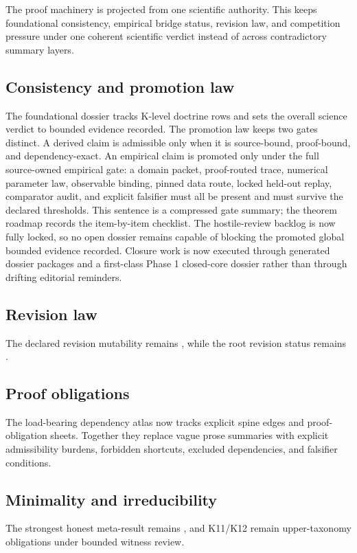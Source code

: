 The proof machinery is projected from one scientific authority. This keeps foundational consistency, empirical bridge status, revision law, and competition pressure under one coherent scientific verdict instead of across contradictory summary layers.

\subsection{Consistency and promotion law}
The foundational dossier tracks  K-level doctrine rows and sets the overall science verdict to bounded evidence recorded.
The promotion law keeps two gates distinct. A derived claim is admissible only when it is source-bound, proof-bound, and dependency-exact. An empirical claim is promoted only under the full source-owned empirical gate: a domain packet, proof-routed trace, numerical parameter law, observable binding, pinned data route, locked held-out replay, comparator audit, and explicit falsifier must all be present and must survive the declared thresholds. This sentence is a compressed gate summary; the theorem roadmap records the item-by-item checklist.
The hostile-review backlog is now fully locked, so no open dossier remains capable of blocking the promoted global bounded evidence recorded.
Closure work is now executed through generated dossier packages and a first-class Phase 1 closed-core dossier rather than through drifting editorial reminders.

\subsection{Revision law}
The declared revision mutability remains , while the root revision status remains .

\subsection{Proof obligations}
The load-bearing dependency atlas now tracks  explicit spine edges and  proof-obligation sheets. Together they replace vague prose summaries with explicit admissibility burdens, forbidden shortcuts, excluded dependencies, and falsifier conditions.

\subsection{Minimality and irreducibility}
The strongest honest meta-result remains , and K11/K12 remain upper-taxonomy obligations under bounded witness review.


